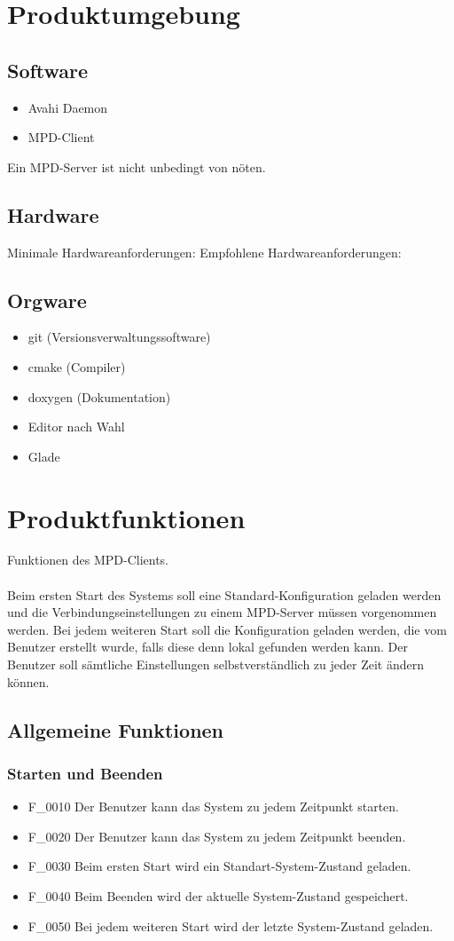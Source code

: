 \section{Produktumgebung}
\subsection{Software}
\begin{itemize}
	\item Avahi Daemon
	\item MPD-Client
\end{itemize}
Ein MPD-Server ist nicht unbedingt von nöten.
\subsection{Hardware}
Minimale Hardwareanforderungen:
Empfohlene Hardwareanforderungen:
\subsection{Orgware}
\begin{itemize}
	\item git (Versionsverwaltungssoftware)
	\item cmake (Compiler)
	\item doxygen (Dokumentation)
	\item Editor nach Wahl
	\item Glade
\end{itemize}
\section{Produktfunktionen}
Funktionen des MPD-Clients.\ \\ \\
Beim ersten Start des Systems soll eine Standard-Konfiguration geladen werden und die Verbindungseinstellungen
zu einem MPD-Server müssen vorgenommen werden. Bei jedem weiteren Start soll die Konfiguration geladen werden,
die vom Benutzer erstellt wurde, falls diese denn lokal gefunden werden kann. Der Benutzer soll sämtliche
Einstellungen selbstverständlich zu jeder Zeit ändern können.
\subsection{Allgemeine Funktionen}
\subsubsection{Starten und Beenden}
\begin{itemize}
	\item F\_0010 Der Benutzer kann das System zu jedem Zeitpunkt starten.
	\item F\_0020 Der Benutzer kann das System zu jedem Zeitpunkt beenden.
	\item F\_0030 Beim ersten Start wird ein Standart-System-Zustand geladen.
	\item F\_0040 Beim Beenden wird der aktuelle System-Zustand gespeichert.
	\item F\_0050 Bei jedem weiteren Start wird der letzte System-Zustand geladen.
\end{itemize}
